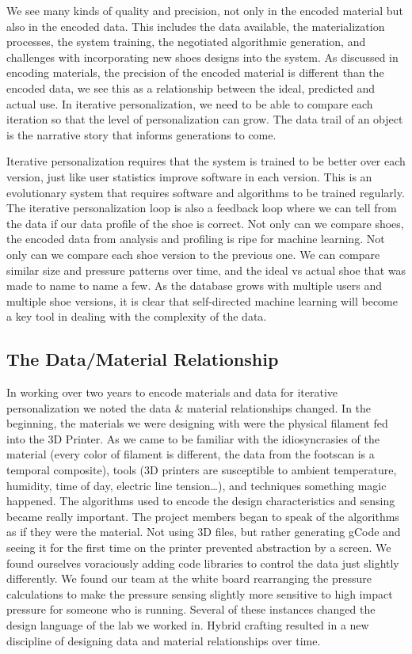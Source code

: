 We see many kinds of quality and precision, not only in the encoded material but also in the encoded data. This includes the data available, the materialization processes, the system training, the negotiated algorithmic generation, and challenges with incorporating new shoes designs into the system. As discussed in encoding materials, the precision of the encoded material is different than the encoded data, we see this as a relationship between the ideal, predicted and actual use. In iterative personalization, we need to be able to compare each iteration so that the level of personalization can grow. The data trail of an object is the narrative story that informs generations to come.  

Iterative personalization requires that the system is trained to be better over each version, just like user statistics improve software in each version. This is an evolutionary system that requires software and algorithms to be trained regularly. The iterative personalization loop is also a feedback loop where we can tell from the data if our data profile of the shoe is correct. Not only can we compare shoes, the encoded data from analysis and profiling is ripe for machine learning. Not only can we compare each shoe version to the previous one. We can compare similar size and pressure patterns over time, and the ideal vs actual shoe that was made to name to name a few. As the database grows with multiple users and multiple shoe versions, it is clear that self-directed machine learning will become a key tool in dealing with the complexity of the data.  

\subsection{The Data/Material Relationship}
In working over two years to encode materials and data for iterative personalization we noted the data \& material relationships changed. In the beginning, the materials we were designing with were the physical filament fed into the 3D Printer. As we came to be familiar with the idiosyncrasies of the material (every color of filament is different, the data from the footscan is a temporal composite), tools (3D printers are susceptible to ambient temperature, humidity, time of day, electric line tension…), and techniques something magic happened. The algorithms used to encode the design characteristics and sensing became really important. The project members began to speak of the algorithms as if they were the material. Not using 3D files, but rather generating gCode and seeing it for the first time on the printer prevented abstraction by a screen. We found ourselves voraciously adding code libraries to control the data just slightly differently. We found our team at the white board rearranging the pressure calculations to make the pressure sensing slightly more sensitive to high impact pressure for someone who is running. Several of these instances changed the design language of the lab we worked in. Hybrid crafting resulted in a new discipline of designing data and material relationships over time. 

